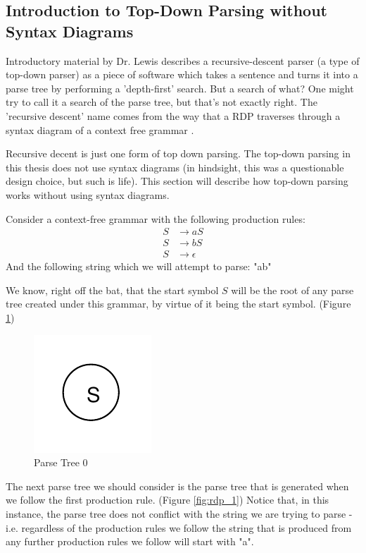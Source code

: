 \documentclass[11pt]{article}
\begin{document}
\subsection{Introduction to Top-Down Parsing without Syntax Diagrams}
\label{rd_wo_sd}
Introductory material by Dr. Lewis \cite{lewis} describes a recursive-descent parser (a type of top-down parser)
as a piece of software which takes a sentence and turns it into a parse tree by performing a 'depth-first' search. 
But a search of what? One might try to call it a search of the parse tree, but that's not exactly right.
The 'recursive descent' name comes from the way that a RDP traverses through a
syntax diagram of a context free grammar \cite{compiler}.

Recursive decent is just one form of top down parsing. The top-down parsing in this thesis
does not use syntax diagrams (in hindsight, this was a questionable design choice, 
but such is life). This section will describe how top-down parsing works without
using syntax diagrams.

Consider a context-free grammar with the following production rules:
\setcounter{equation}{0}
\begin{align}
S &\rightarrow a S\\
S &\rightarrow b S\\
S &\rightarrow \epsilon
\end{align}
And the following string which we will attempt to parse: "ab"

We know, right off the bat, that the start symbol $S$ will be the root of any parse tree created under this
grammar, by virtue of it being the start symbol. (Figure \ref{fig:rdp_0})

\begin{figure}[h!]
    \centering
    \includegraphics[natwidth=15,natheight=15]{umlet/rdp_0.pdf}
    \caption{Parse Tree 0}
    \label{fig:rdp_0}
\end{figure}

The next parse tree we should consider is the parse tree that is generated when we follow the first 
production rule. (Figure \ref{fig:rdp_1}) Notice that, in this instance, the parse tree does not conflict with
the string we are trying to parse - i.e. regardless of the production rules we follow the string that is
produced from any further production rules we follow will start with "a".
\end{document}
